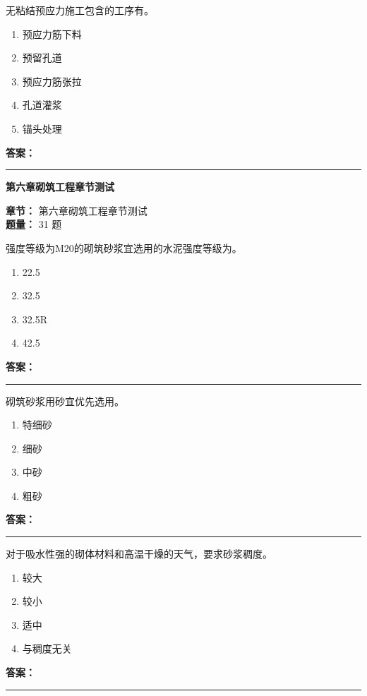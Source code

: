 \documentclass[UTF8,fontset=fandol,11pt]{ctexart}
\newcommand{\chaptertitle}[1]{\vspace{0.5em}\begin{tcolorbox}[enhanced,colback=deepblue,colframe=deepblue,arc=2mm,boxrule=0pt]\begin{center}\Large\bfseries\color{white}#1\end{center}\end{tcolorbox}\vspace{0.5em}}
\newcommand{\answerline}{\textcolor{answerred}{\rule{2.4cm}{0.7pt}}}
\begin{document}
\begin{quizbox}[title={第 7 题}]
无粘结预应力施工包含的工序有。\\
\begin{enumerate}[label=\Alph*.]
\item 预应力筋下料
\item 预留孔道
\item 预应力筋张拉
\item 孔道灌浆
\item 锚头处理
\end{enumerate}
\textbf{\textcolor{answerred}{答案：}} \answerline
\end{quizbox}

\chaptertitle{第六章砌筑工程章节测试}
\begin{mainbox}
\textbf{\textcolor{mainblue}{章节：}} 第六章砌筑工程章节测试\\
\textbf{\textcolor{answerred}{题量：}} 31 题
\end{mainbox}

\begin{quizbox}[title={第 1 题}]
强度等级为M20的砌筑砂浆宜选用的水泥强度等级为。\\
\begin{enumerate}[label=\Alph*.]
\item 22.5
\item 32.5
\item 32.5R
\item 42.5
\end{enumerate}
\textbf{\textcolor{answerred}{答案：}} \answerline
\end{quizbox}

\begin{quizbox}[title={第 2 题}]
砌筑砂浆用砂宜优先选用。\\
\begin{enumerate}[label=\Alph*.]
\item 特细砂
\item 细砂
\item 中砂
\item 粗砂
\end{enumerate}
\textbf{\textcolor{answerred}{答案：}} \answerline
\end{quizbox}

\begin{quizbox}[title={第 3 题}]
对于吸水性强的砌体材料和高温干燥的天气，要求砂浆稠度。\\
\begin{enumerate}[label=\Alph*.]
\item 较大
\item 较小
\item 适中
\item 与稠度无关
\end{enumerate}
\textbf{\textcolor{answerred}{答案：}} \answerline
\end{quizbox}
\end{document}
